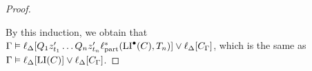 \begin{proof}
\begin{itemize}

	\end{itemize}

	By this induction, we obtain that
	$\Gamma \vDash \ell_{\Delta}[ Q_1 z'_{t_1} \dots Q_n z'_{t_n} \ell_\mathrm{part}^*( \operatorname{LI}^\bullet(C), T_n )] \lor \ell_{\Delta}[C_\Gamma]$, which is the same as
	$\Gamma \vDash \ell_{\Delta}[ \operatorname{LI}(C)] \lor \ell_{\Delta}[C_\Gamma]$.
\end{proof}

